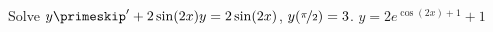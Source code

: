 {Solve $y\primeskip'+ 2\sin(2x) y = 2\sin(2x)$, $y(\nicefrac{\pi}{2}) = 3$.}
{$y = 2 e^{\cos(2x)+1} + 1$}
